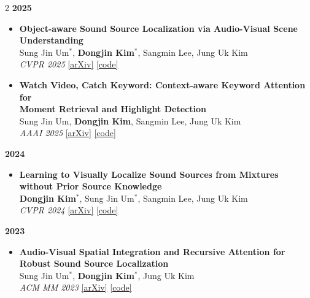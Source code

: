 \documentclass[10pt,a4paper,ragged2e,withhyper]{altacv}
\begin{document}
\begin{paracol}{2}
\medskip
\textcolor{heading}{\textbf{2025}}
\smallskip

\begin{itemize}[leftmargin=1em,nosep,itemsep=3pt]
  \item \textbf{Object-aware Sound Source Localization via Audio-Visual Scene Understanding}\\
        {\small Sung Jin Um$^*$, \textbf{Dongjin Kim}$^*$, Sangmin Lee, Jung Uk Kim}\\
        {\footnotesize \textit{CVPR 2025} \quad
        \href{https://arxiv.org/pdf/2506.18557}{[arXiv]}
        \href{https://github.com/VisualAIKHU/OA-SSL}{[code]}}

  \item \textbf{Watch Video, Catch Keyword: Context-aware Keyword Attention for\\
        Moment Retrieval and Highlight Detection}\\
        {\small Sung Jin Um, \textbf{Dongjin Kim}, Sangmin Lee, Jung Uk Kim}\\
        {\footnotesize \textit{AAAI 2025} \quad
        \href{https://arxiv.org/pdf/2501.02504}{[arXiv]}
        \href{https://github.com/VisualAIKHU/Keyword-DETR}{[code]}}
\end{itemize}

\medskip
\textcolor{heading}{\textbf{2024}}
\smallskip

\begin{itemize}[leftmargin=1em,nosep,itemsep=3pt]
  \item \textbf{Learning to Visually Localize Sound Sources from Mixtures\\
        without Prior Source Knowledge}\\
        {\small \textbf{Dongjin Kim}$^*$, Sung Jin Um$^*$, Sangmin Lee, Jung Uk Kim}\\
        {\footnotesize \textit{CVPR 2024} \quad
        \href{https://arxiv.org/pdf/2403.17420}{[arXiv]}
        \href{https://github.com/VisualAIKHU/NoPrior_MultiSSL}{[code]}}
\end{itemize}

\medskip
\textcolor{heading}{\textbf{2023}}
\smallskip

\begin{itemize}[leftmargin=1em,nosep,itemsep=3pt]
  \item \textbf{Audio-Visual Spatial Integration and Recursive Attention for\\
        Robust Sound Source Localization}\\
        {\small Sung Jin Um$^*$, \textbf{Dongjin Kim}$^*$, Jung Uk Kim}\\
        {\footnotesize \textit{ACM MM 2023} \quad
        \href{https://arxiv.org/pdf/2308.06087}{[arXiv]}
        \href{https://github.com/VisualAIKHU/SIRA-SSL}{[code]}}
\end{itemize}


\end{paracol}
\end{document}
